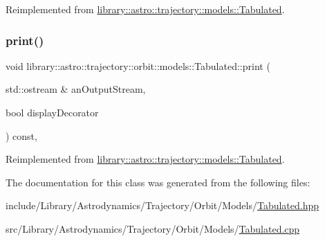 Reimplemented from \hyperlink{classlibrary_1_1astro_1_1trajectory_1_1models_1_1_tabulated_af733fafd705bd6a1f204acdbaf2e9646}{library\+::astro\+::trajectory\+::models\+::\+Tabulated}.

\mbox{\label{classlibrary_1_1astro_1_1trajectory_1_1orbit_1_1models_1_1_tabulated_a545a7209580a0c3863f37e2bdd925cb6}} 
\subsubsection{\texorpdfstring{print()}{print()}}
{\footnotesize\ttfamily void library\+::astro\+::trajectory\+::orbit\+::models\+::\+Tabulated\+::print (\begin{DoxyParamCaption}\item[{std\+::ostream \&}]{an\+Output\+Stream,  }\item[{bool}]{display\+Decorator }\end{DoxyParamCaption}) const\hspace{0.3cm}{\ttfamily [override]}, {\ttfamily [virtual]}}



Reimplemented from \hyperlink{classlibrary_1_1astro_1_1trajectory_1_1models_1_1_tabulated_a3eae12849178fe43d30a620edceddd8e}{library\+::astro\+::trajectory\+::models\+::\+Tabulated}.



The documentation for this class was generated from the following files\+:\begin{DoxyCompactItemize}
\item 
include/\+Library/\+Astrodynamics/\+Trajectory/\+Orbit/\+Models/\hyperlink{_orbit_2_models_2_tabulated_8hpp}{Tabulated.\+hpp}\item 
src/\+Library/\+Astrodynamics/\+Trajectory/\+Orbit/\+Models/\hyperlink{_orbit_2_models_2_tabulated_8cpp}{Tabulated.\+cpp}\end{DoxyCompactItemize}

